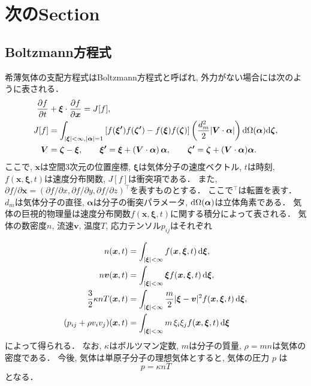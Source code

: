 \documentclass[../main/thesis_template]{subfiles}
\begin{document}
\section{次のSection}

\subsection{Boltzmann方程式}
希薄気体の支配方程式はBoltzmann方程式と呼ばれ, 外力がない場合には次のように表される．
\begin{align}
  \frac{\partial f}{\partial t} &+ \bm{\xi}\cdot\frac{\partial f}{\partial \bm{x}}=J[f], 
    \label{eq:Boltzmann}\\
  J[f] 
    &= \int_{|\bm{\xi}|<\infty,|\bm{\alpha}|=1}
      \left[ f(\bm{\xi^\prime})f(\bm{\zeta^\prime})-f(\bm{\xi})f(\bm{\zeta}) \right] 
      \left( \frac{d_m^2}{2}|\bm{V}\cdot\bm{\alpha}|\right)
      \mathrm{d}\Omega(\bm{\alpha})\mathrm{d}\bm{\zeta}, \notag\\
  \bm{V} &= \bm{\zeta} - \bm{\xi}, \qquad
  \bm{\xi^\prime} = \bm{\xi} + \left(\bm{V}\cdot\bm{\alpha}\right)\bm{\alpha}, \qquad
  \bm{\zeta^\prime} = \bm{\zeta} + (\bm{V}\cdot\bm{\alpha})\bm{\alpha}. \notag
\end{align}
ここで, $\bm{x}$は空間3次元の位置座標, $\bm{\xi}$は気体分子の速度ベクトル, $t$は時刻, $f(\bm{x},\bm{\xi},t)$は速度分布関数, $J[f]$は衝突項である．
また, $\partial f/\partial\bm{x}=(\partial f/\partial x,\partial f/\partial y,\partial f/\partial z)^\top$を表すものとする．
ここで${}^\top$は転置を表す．
$d_m$は気体分子の直径, $\bm{\alpha}$は分子の衝突パラメータ, $\mathrm{d}\Omega(\bm{\alpha})$は立体角素である．
気体の巨視的物理量は速度分布関数$f(\bm{x},\bm{\xi},t)$に関する積分によって表される．
気体の数密度$n$, 流速$\bm{v}$, 温度$T$, 応力テンソル$p_{ij}$はそれぞれ
\begin{subeq}
\begin{align}
  n(\bm{x},t) &= 
    \int_{|\bm{\xi}|<\infty}
    f(\bm{x},\bm{\xi},t) \,\mathrm{d}\bm{\xi}, \label{eq:n}\\
  n\bm{v}(\bm{x},t) &= 
    \int_{|\bm{\xi}|<\infty}
    \bm{\xi}f(\bm{x},\bm{\xi},t) \,\mathrm{d}\bm{\xi}, \label{eq:v}\\
  \frac{3}{2} \kappa n T(\bm{x},t) &= 
    \int_{|\bm{\xi}|<\infty}
    \frac{m}{2}|\bm{\xi}-\bm{v}|^2f(\bm{x},\bm{\xi},t) \,\mathrm{d}\bm{\xi}, 
    \label{eq:T}\\
  (p_{ij}+\rho v_iv_j)(\bm{x},t) &= 
    \int_{|\bm{\xi}|<\infty}
    m\,\xi_i\xi_jf(\bm{x},\bm{\xi},t)\,\mathrm{d}\bm{\xi} \label{eq:pij}
\end{align}
によって得られる．
なお, $\kappa$はボルツマン定数, $m$は分子の質量, $\rho=mn$は気体の密度である．
今後, 気体は単原子分子の理想気体とする\cite{Asakura2022}と, 気体の圧力 $p$ は
\begin{equation}
  p = \kappa nT \label{eq:p}
\end{equation}
となる．
\end{subeq}
\end{document}
